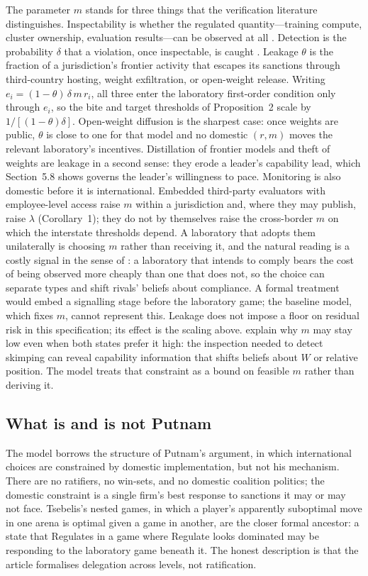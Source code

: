 \documentclass[11pt]{article}
\theoremstyle{plain}
\theoremstyle{definition}
\theoremstyle{remark}
\begin{document}
The parameter $m$ stands for three things that the verification literature distinguishes. Inspectability is whether the regulated quantity---training compute, cluster ownership, evaluation results---can be observed at all \citep{shavit2023,sastry2024}. Detection is the probability $\delta$ that a violation, once inspectable, is caught \citep{wasil2024}. Leakage $\theta$ is the fraction of a jurisdiction's frontier activity that escapes its sanctions through third-country hosting, weight exfiltration, or open-weight release. Writing $e_i=(1-\theta)\,\delta\,m\,r_i$, all three enter the laboratory first-order condition only through $e_i$, so the bite and target thresholds of Proposition~2 scale by $1/[(1-\theta)\delta]$. Open-weight diffusion is the sharpest case: once weights are public, $\theta$ is close to one for that model and no domestic $(r,m)$ moves the relevant laboratory's incentives. Distillation of frontier models and theft of weights are leakage in a second sense: they erode a leader's capability lead, which Section~5.8 shows governs the leader's willingness to pace. Monitoring is also domestic before it is international. Embedded third-party evaluators with employee-level access raise $m$ within a jurisdiction and, where they may publish, raise $\lambda$ (Corollary~1); they do not by themselves raise the cross-border $m$ on which the interstate thresholds depend. A laboratory that adopts them unilaterally is choosing $m$ rather than receiving it, and the natural reading is a costly signal in the sense of \citet{kydd2000}: a laboratory that intends to comply bears the cost of being observed more cheaply than one that does not, so the choice can separate types and shift rivals' beliefs about compliance. A formal treatment would embed a signalling stage before the laboratory game; the baseline model, which fixes $m$, cannot represent this. Leakage does not impose a floor on residual risk in this specification; its effect is the scaling above. \citet{coe2020} explain why $m$ may stay low even when both states prefer it high: the inspection needed to detect skimping can reveal capability information that shifts beliefs about $W$ or relative position. The model treats that constraint as a bound on feasible $m$ rather than deriving it.

\subsection{What is and is not Putnam}

The model borrows the structure of Putnam's argument, in which international choices are constrained by domestic implementation, but not his mechanism. There are no ratifiers, no win-sets, and no domestic coalition politics; the domestic constraint is a single firm's best response to sanctions it may or may not face. Tsebelis's nested games, in which a player's apparently suboptimal move in one arena is optimal given a game in another, are the closer formal ancestor: a state that Regulates in a game where Regulate looks dominated may be responding to the laboratory game beneath it. The honest description is that the article formalises delegation across levels, not ratification.
\end{document}
